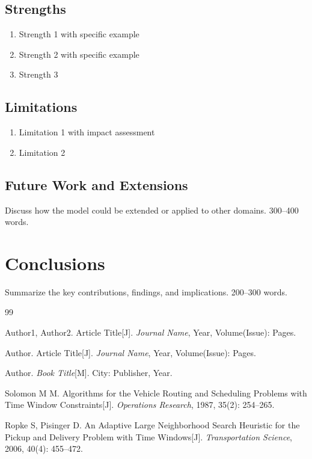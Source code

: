 \documentclass[12pt,letterpaper]{article}
\numberwithin{equation}{section}
\numberwithin{figure}{section}
\numberwithin{table}{section}
\begin{document}
\subsection{Strengths}
\begin{enumerate}
    \item \textlangle Strength 1 with specific example\textrangle
    \item \textlangle Strength 2 with specific example\textrangle
    \item \textlangle Strength 3\textrangle
\end{enumerate}

\subsection{Limitations}
\begin{enumerate}
    \item \textlangle Limitation 1 with impact assessment\textrangle
    \item \textlangle Limitation 2\textrangle
\end{enumerate}

\subsection{Future Work and Extensions}
\textlangle Discuss how the model could be extended or applied to other domains. 300--400 words.\textrangle

\section{Conclusions}
\textlangle Summarize the key contributions, findings, and implications. 200--300 words.\textrangle

\newpage
\begin{thebibliography}{99}

 Author1, Author2. Article Title[J]. \emph{Journal Name}, Year, Volume(Issue): Pages.

 Author. Article Title[J]. \emph{Journal Name}, Year, Volume(Issue): Pages.

 Author. \emph{Book Title}[M]. City: Publisher, Year.

 Solomon M M. Algorithms for the Vehicle Routing and Scheduling Problems with Time Window Constraints[J]. \emph{Operations Research}, 1987, 35(2): 254--265.

 Ropke S, Pisinger D. An Adaptive Large Neighborhood Search Heuristic for the Pickup and Delivery Problem with Time Windows[J]. \emph{Transportation Science}, 2006, 40(4): 455--472.

\end{thebibliography}
\end{document}
